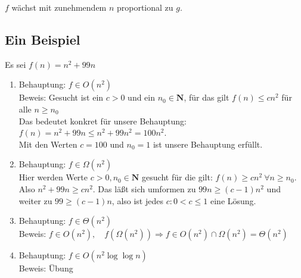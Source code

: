 \documentclass[ngerman,draft,parskip=half*,twoside]{scrreprt}
\theoremstyle{break}
\begin{document}
$f$ wächst mit zunehmendem $n$ proportional zu $g$.

%
%

\subsection{Ein Beispiel}
Es sei $f(n) = n^2+99n$

\begin{enumerate}
\item   Behauptung: $f \in O(n^2)$\\
        Beweis: Gesucht ist ein $c>0$ und ein $n_0 \in \mathbf{N}$, für das gilt $f(n)\leq c n^2 $ 
        für alle $n\geq n_0$\\
        Das bedeutet konkret für unsere Behauptung:\\
        $f(n)= n^2+99n \leq n^2+99n^2 =100 n^2$.\\
        Mit den Werten $c=100$ und $n_0 = 1$ ist unsere Behauptung erfüllt.

\item   Behauptung: $f \in \Omega(n^2)$\\
        Hier werden Werte $c>0, n_0 \in \mathbf{N}$ gesucht für die gilt: $f(n) \geq c n^2\ \forall n\geq n_0$. Also $n^2+99n \geq
        c n^2$. Das läßt sich umformen zu $99n \geq (c-1)n^2$ und weiter zu $99 \geq (c-1)n$, also ist jedes $c\colon  0<c \leq 1$ eine
        Lösung.

\item   Behauptung: $f \in \Theta(n^2)$\\
        Beweis: $f \in O(n^2), \quad f(\Omega(n^2)) \Rightarrow f \in O(n^2)\cap \Omega(n^2)=\Theta(n^2)$

\item   Behauptung: $f \in O(n^2 \log\log n)$\\
        Beweis: Übung
\end{enumerate}
\end{document}
